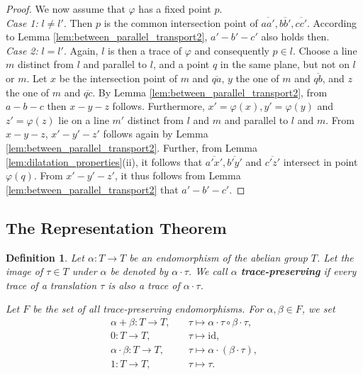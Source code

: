 \documentclass[11pt,a4paper]{article}
\newcommand{\betw}[3]{#1 - #2 - #3}
\newcommand{\lineab}[1]{\overline{#1}}
\newtheorem{definition}[theorem]{Definition}
\begin{document}
\begin{proof}
We now assume that $\varphi$ has a fixed point $p$. \\
\textit{Case 1:} $l \neq l'$. Then $p$ is the common intersection point of $\lineab{aa'}, \lineab{bb'}, \lineab{cc'}$. According to Lemma \ref{lem:between_parallel_transport2}, $\betw{a'}{b'}{c'}$ also holds then. \\
\textit{Case 2:} $l = l'$. Again, $l$ is then a trace of $\varphi$ and consequently $p \in l$. Choose a line $m$ distinct from $l$ and parallel to $l$, and a point $q$ in the same plane, but not on $l$ or $m$. Let $x$ be the intersection point of $m$ and $\lineab{qa}$, $y$ the one of $m$ and $\lineab{qb}$, and $z$ the one of $m$ and $\lineab{qc}$. By Lemma \ref{lem:between_parallel_transport2}, from $\betw{a}{b}{c}$ then $\betw{x}{y}{z}$ follows. Furthermore, $x' = \varphi(x), y' = \varphi(y)$ and $z' = \varphi(z)$ lie on a line $m'$ distinct from $l$ and $m$ and parallel to $l$ and $m$. From $\betw{x}{y}{z}$, $\betw{x'}{y'}{z'}$ follows again by Lemma \ref{lem:between_parallel_transport2}. Further, from Lemma \ref{lem:dilatation_properties}(ii), it follows that $\lineab{a'x'}, \lineab{b'y'}$ and $\lineab{c'z'}$ intersect in point $\varphi(q)$. From $\betw{x'}{y'}{z'}$, it thus follows from Lemma \ref{lem:between_parallel_transport2} that $\betw{a'}{b'}{c'}$.
\end{proof}

\subsection{The Representation Theorem}

\begin{definition} \label{def:trace_preserving}
Let $\alpha: T \to T$ be an endomorphism of the abelian group $T$. Let the image of $\tau \in T$ under $\alpha$ be denoted by $\alpha \cdot \tau$. We call $\alpha$ \textbf{trace-preserving} if every trace of a translation $\tau$ is also a trace of $\alpha \cdot \tau$.

Let $F$ be the set of all trace-preserving endomorphisms. For $\alpha, \beta \in F$, we set
\begin{align*}
    \alpha + \beta: T \to T, \quad &\tau \mapsto \alpha \cdot \tau \circ \beta \cdot \tau, \\
    0: T \to T, \quad &\tau \mapsto \text{id}, \\
    \alpha \cdot \beta: T \to T, \quad &\tau \mapsto \alpha \cdot (\beta \cdot \tau), \\
    1: T \to T, \quad &\tau \mapsto \tau.
\end{align*}
\end{definition}
\end{document}
